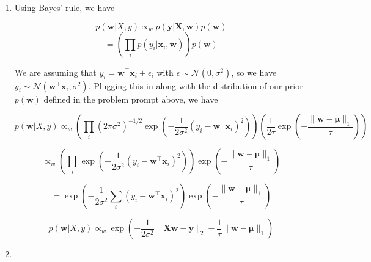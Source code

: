 \documentclass[submit]{harvardml}
\begin{document}
\begin{enumerate}

\item 

Using Bayes' rule, we have 

$$p(\mathbf{w}|X,y) \propto_w p(\mathbf{y}|\mathbf{X},\mathbf{w}) p(\mathbf{w})$$
$$=\left( \prod_i p(y_i|\mathbf{x}_i,\mathbf{w}) \right) p(\mathbf{w})$$

We are assuming that $y_i= \mathbf{w}^\top \mathbf{x}_i + \epsilon_i$ with $\epsilon \sim \mathcal{N}(0, \sigma^2)$,
so we have $y_i\sim \mathcal{N}(\mathbf{w}^\top \mathbf{x}_i, \sigma^2)$. Plugging this in along with the 
distribution of our prior $p(\mathbf{w})$ defined in the problem prompt above, we have

$$p(\mathbf{w}|X,y) \propto_w 
\left(\prod_i (2\pi\sigma^2)^{-1/2}\exp\left(-\frac{1}{2\sigma^2}(y_i-\mathbf{w}^\top \mathbf{x}_i)^2\right) \right)
\left(\frac{1}{2\tau} \exp\left(-\frac{\|\mathbf{w}-\mathbf{\mu}\|_1}{\tau}\right)\right)$$

$$ \propto_w  \left(\prod_i \exp\left(-\frac{1}{2\sigma^2}(y_i-\mathbf{w}^\top \mathbf{x}_i)^2\right)\right) \exp\left(-\frac{\|\mathbf{w}-\mathbf{\mu}\|_1}{\tau}\right)$$

$$ = \exp\left(-\frac{1}{2\sigma^2}\sum_i(y_i-\mathbf{w}^\top \mathbf{x}_i)^2\right) \exp\left(-\frac{\|\mathbf{w}-\mathbf{\mu}\|_1}{\tau}\right)$$

$$ p(\mathbf{w}|X,y)\propto_w \exp\left(-\frac{1}{2\sigma^2}\|\mathbf{Xw}-\mathbf{y}\|_2 -\frac{1}{\tau}\|\mathbf{w}-\mathbf{\mu}\|_1\right)$$

\item 


\end{enumerate}


\newpage
\end{document}
